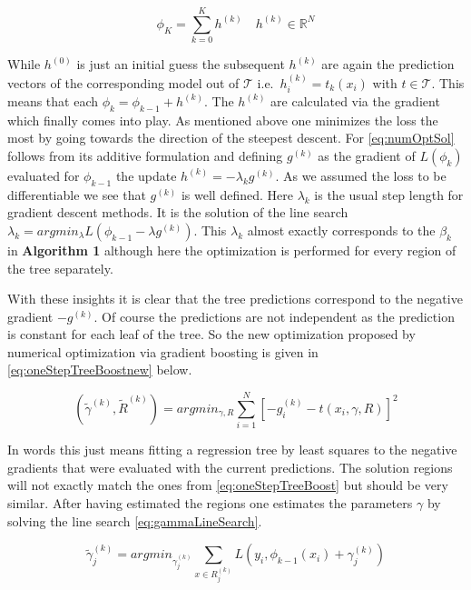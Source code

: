 \documentclass[
]{book}
\begin{document}
\begin{equation}
  \phi_K = \sum_{k=0}^K h^{(k)} \quad h^{(k)} \in \mathbb{R}^N 
  \label{eq:numOptSol}
\end{equation}

While \(h^{(0)}\) is just an initial guess the subsequent \(h^{(k)}\) are again the prediction vectors of the corresponding model out of \(\mathcal{T}\) i.e.~\(h^{(k)}_{i} = t_k(x_i)\) with \(t \in \mathcal{T}\). This means that each \(\phi_k = \phi_{k-1} + h^{(k)}\). The \(h^{(k)}\) are calculated via the gradient which finally comes into play. As mentioned above one minimizes the loss the most by going towards the direction of the steepest descent. For \eqref{eq:numOptSol} follows from its additive formulation and defining \(g^{(k)}\) as the gradient of \(L(\phi_k)\) evaluated for \(\phi_{k-1}\) the update \(h^{(k)} = -\lambda_k g^{(k)}\). As we assumed the loss to be differentiable we see that \(g^{(k)}\) is well defined. Here \(\lambda_k\) is the usual step length for gradient descent methods. It is the solution of the line search \(\lambda_k = argmin_{\lambda} L(\phi_{k-1} - \lambda g^{(k)})\). This \(\lambda_k\) almost exactly corresponds to the \(\beta_k\) in \textbf{Algorithm 1} although here the optimization is performed for every region of the tree separately.\citep{elements}

With these insights it is clear that the tree predictions correspond to the negative gradient \(-g^{(k)}\). Of course the predictions are not independent as the prediction is constant for each leaf of the tree. So the new optimization proposed by numerical optimization via gradient boosting is given in \eqref{eq:oneStepTreeBoostnew} below.

\begin{equation}
  (\tilde{\gamma}^{(k)},\tilde{R}^{(k)}) = argmin_{\gamma,R} \sum_{i=1}^N [-g^{(k)}_{i} -  t(x_i,\gamma,R)] ^2
  \label{eq:oneStepTreeBoostnew}
\end{equation}

In words this just means fitting a regression tree by least squares to the negative gradients that were evaluated with the current predictions. The solution regions will not exactly match the ones from \eqref{eq:oneStepTreeBoost} but should be very similar.\citep{elements} After having estimated the regions one estimates the parameters \(\gamma\) by solving the line search \eqref{eq:gammaLineSearch}.

\begin{equation}
  \tilde{\gamma}^{(k)}_{j} = argmin_{\gamma^{(k)}_{j}} \sum_{x \in R^{(k)}_{j}} L(y_i,\phi_{k-1}(x_i) + \gamma^{(k)}_{j})
  \label{eq:gammaLineSearch}
\end{equation}
\end{document}
